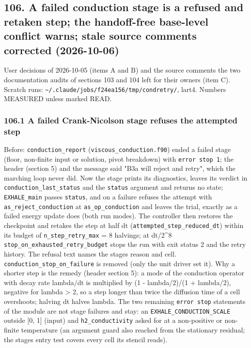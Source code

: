 \documentclass[english,a4paper]{my_memo}
\begin{document}
\subsection{106. A failed conduction stage is a refused and retaken step; the handoff-free base-level conflict warns; stale source comments corrected (2026-10-06)}\label{106-a-failed-conduction-stage-is-a-refused-and-retaken-step-the-handoff-free-base-level-conflict-warns-stale-source-comments-corrected-2026-10-06}

User decisions of 2026-10-05 (items A and B) and the source comments the two
documentation audits of sections 103 and 104 left for their owners (item C).
Scratch runs: \texttt{\textasciitilde{}/.claude/jobs/f24ea156/tmp/condretry/}, lart4. Numbers
MEASURED unless marked READ.

\subsubsection{106.1 A failed Crank-Nicolson stage refuses the attempted step}\label{1061-a-failed-crank-nicolson-stage-refuses-the-attempted-step}

Before: \texttt{conduction\_report} (\texttt{viscous\_conduction.f90}) ended a failed stage
(floor, non-finite input or solution, pivot breakdown) with \texttt{error\ stop\ 1};
the header (section 5) and the message said "B3a will reject and retry",
which the marching loop never did. Now the stage prints its diagnostics,
leaves its verdict in \texttt{conduction\_last\_status} and the \texttt{status} argument and
returns no state; \texttt{EXHALE\_main} passes \texttt{status}, and on a failure refuses the
attempt with \texttt{as\_reject\_conduction} at \texttt{as\_op\_conduction} and leaves the trial,
exactly as a failed energy update does (both run modes). The controller then
restores the checkpoint and retakes the step at half dt
(\texttt{attempted\_step\_reduced\_dt}) within its budget of \texttt{n\_step\_retry\_max} = 8
halvings; at dt/2\^{}8 \texttt{stop\_on\_exhausted\_retry\_budget} stops the run with exit
status 2 and the retry history. The refusal text names the stage\textquotesingle s reason
and cell. \texttt{conduction\_stop\_on\_failure} is removed (only the unit driver set
it). Why a shorter step is the remedy (header section 5): a mode of the
conduction operator with decay rate lambda/dt is multiplied by
(1 - lambda/2)/(1 + lambda/2), negative for lambda \textgreater{} 2, so a step longer than
twice the diffusion time of a cell overshoots; halving dt halves lambda. The
two remaining \texttt{error\ stop} statements of the module are not stage failures
and stay: an \texttt{EXHALE\_CONDUCTION\_SCALE} outside {[}0, 1{]} (input) and
\texttt{h2\_conductivity} asked for at a non-positive or non-finite temperature (an
argument guard also reached from the stationary residual; the stage\textquotesingle s entry
test covers every cell its stencil reads).
\end{document}
